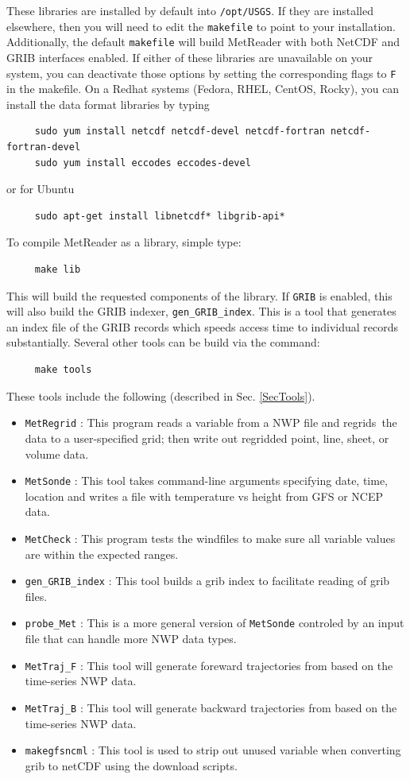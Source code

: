 \documentclass[11pt]{article}   %
\begin{document}
These libraries are installed by default into \texttt{/opt/USGS}.  If they are
installed elsewhere, then you will need to edit the \texttt{makefile}
to point to your installation.
Additionally, the default \texttt{makefile} will build MetReader with both NetCDF and GRIB
interfaces enabled.  If either of these libraries are unavailable on your system, you can
deactivate those options by setting the corresponding flags to \texttt{F} in the makefile.
On a Redhat systems (Fedora, RHEL, CentOS, Rocky), you can install the data
format libraries by typing
\begin{verbatim}
     sudo yum install netcdf netcdf-devel netcdf-fortran netcdf-fortran-devel
     sudo yum install eccodes eccodes-devel
\end{verbatim}
or for Ubuntu
\begin{verbatim}
     sudo apt-get install libnetcdf* libgrib-api*
\end{verbatim}
To compile MetReader as a library, simple type:
\begin{verbatim}
     make lib
\end{verbatim}
This will build the requested components of the library.  If \texttt{GRIB} is enabled,
this will also build the GRIB indexer, \texttt{gen\_GRIB\_index}.
This is a tool that generates an index file of the GRIB records which speeds
access time to individual records substantially.
Several other tools can be build via the command:
\begin{verbatim}
     make tools
\end{verbatim}
These tools include the following (described in Sec. \ref{SecTools}).
\begin{itemize}
\item \texttt{MetRegrid} : This program reads a variable from a NWP file and regrids\
the data to a user-specified grid; then write out regridded point, line, sheet, or volume data.
\item \texttt{MetSonde} : This tool takes command-line arguments specifying date, time, location
and writes a file with temperature vs height from GFS or NCEP data.
\item \texttt{MetCheck} : This program tests the windfiles to make sure all variable values
are within the expected ranges.
\item \texttt{gen\_GRIB\_index} : This tool builds a grib index to facilitate reading of grib
files.
\item \texttt{probe\_Met} : This is a more general version of \texttt{MetSonde} controled by
an input file that can handle more NWP data types.
\item \texttt{MetTraj\_F} : This tool will generate foreward trajectories from based on the
time-series NWP data.
\item \texttt{MetTraj\_B} : This tool will generate backward trajectories from based on the
time-series NWP data.
\item \texttt{makegfsncml} :  This tool is used to strip out unused variable when converting
grib to netCDF using the download scripts.
\end{itemize}
\end{document}
